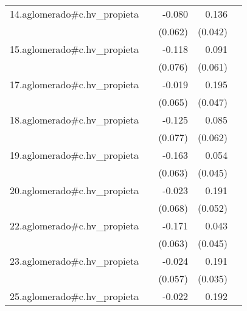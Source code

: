 {\begin{longtable}{l*{4}{D{.}{.}{-1}}}
\addlinespace
14.aglomerado#c.hv\_propieta&                     &      -0.080         &       0.136\sym{**} &                     \\
            &                     &     (0.062)         &     (0.042)         &                     \\
\addlinespace
15.aglomerado#c.hv\_propieta&                     &      -0.118         &       0.091         &                     \\
            &                     &     (0.076)         &     (0.061)         &                     \\
\addlinespace
17.aglomerado#c.hv\_propieta&                     &      -0.019         &       0.195\sym{***}&                     \\
            &                     &     (0.065)         &     (0.047)         &                     \\
\addlinespace
18.aglomerado#c.hv\_propieta&                     &      -0.125         &       0.085         &                     \\
            &                     &     (0.077)         &     (0.062)         &                     \\
\addlinespace
19.aglomerado#c.hv\_propieta&                     &      -0.163\sym{*}  &       0.054         &                     \\
            &                     &     (0.063)         &     (0.045)         &                     \\
\addlinespace
20.aglomerado#c.hv\_propieta&                     &      -0.023         &       0.191\sym{***}&                     \\
            &                     &     (0.068)         &     (0.052)         &                     \\
\addlinespace
22.aglomerado#c.hv\_propieta&                     &      -0.171\sym{**} &       0.043         &                     \\
            &                     &     (0.063)         &     (0.045)         &                     \\
\addlinespace
23.aglomerado#c.hv\_propieta&                     &      -0.024         &       0.191\sym{***}&                     \\
            &                     &     (0.057)         &     (0.035)         &                     \\
\addlinespace
25.aglomerado#c.hv\_propieta&                     &      -0.022         &       0.192\sym{***}&                     \\

\end{longtable}}
